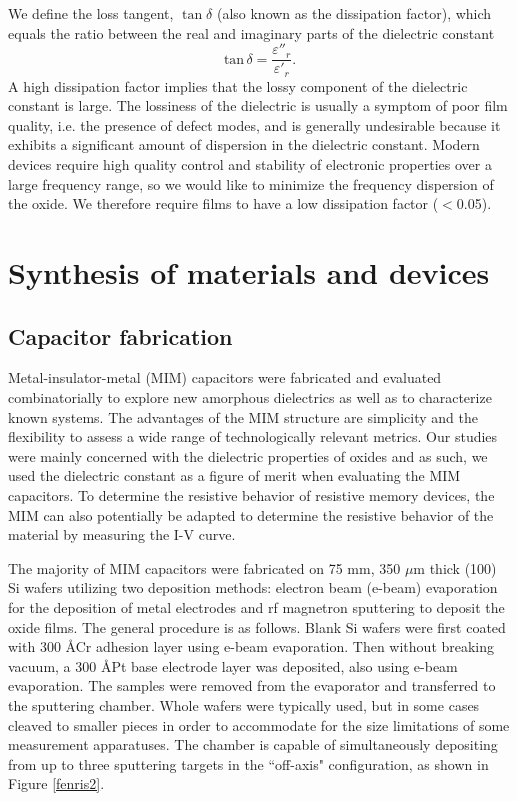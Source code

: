 We define the loss tangent, $\tan{\delta}$ (also known as the dissipation factor), which equals the ratio between the real and imaginary parts of the dielectric constant
\begin{equation}
\text{tan}\,\delta = \frac{\varepsilon''_{r}}{\varepsilon'_{r}}.
\end{equation}
A high dissipation factor implies that the lossy component of the dielectric constant is large. The lossiness of the dielectric is usually a symptom of poor film quality, i.e. the presence of defect modes, and is generally undesirable because it exhibits a significant amount of dispersion in the dielectric constant. Modern devices require high quality control and stability of electronic properties over a large frequency range, so we would like to minimize the frequency dispersion of the oxide. We therefore require films to have a low dissipation factor ($<$0.05).

\section{Synthesis of materials and devices}
\subsection{Capacitor fabrication}

Metal-insulator-metal (MIM) capacitors were fabricated and evaluated combinatorially to explore new amorphous dielectrics as well as to characterize known systems. The advantages of the MIM structure are simplicity and the flexibility to assess a wide range of technologically relevant metrics. Our studies were mainly concerned with the dielectric properties of oxides and as such, we used the dielectric constant as a figure of merit when evaluating the MIM capacitors. To determine the resistive behavior of resistive memory devices, the MIM can also potentially be adapted to determine the resistive behavior of the material by measuring the I-V curve.

The majority of MIM capacitors were fabricated on 75 mm, 350 $\mu$m thick (100) Si wafers utilizing two deposition methods: electron beam (e-beam) evaporation for the deposition of metal electrodes and rf magnetron sputtering to deposit the oxide films. The general procedure is as follows. Blank Si wafers were first coated with 300 \AA\;Cr adhesion layer using e-beam evaporation. Then without breaking vacuum, a 300 \AA\;Pt base electrode layer was deposited, also using e-beam evaporation. The samples were removed from the evaporator and transferred to the sputtering chamber. Whole wafers were typically used, but in some cases cleaved to smaller pieces in order to accommodate for the size limitations of some measurement apparatuses. The chamber is capable of simultaneously depositing from up to three sputtering targets in the ``off-axis" configuration, as shown in Figure \ref{fenris2}.

